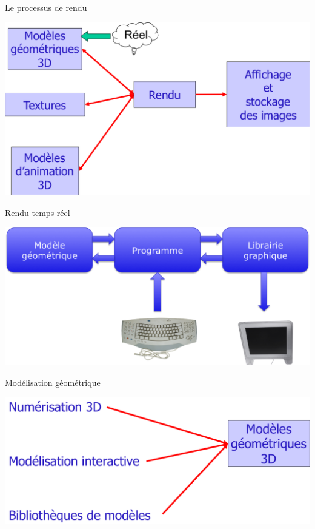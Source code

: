 \begin{frame}{Le processus de rendu}
\begin{center}
\includegraphics[height=.8\textheight]{figs/rendu.png}
\end{center}
\end{frame}

\begin{frame}{Rendu temps-réel}
\begin{center}
\includegraphics[width=.9\textwidth]{figs/rendurt.png}
\end{center}
\end{frame}

\begin{frame}{Modélisation géométrique}
\begin{center}
\includegraphics[width=.9\textwidth]{figs/modgeom.png}
\end{center}

\end{frame}

